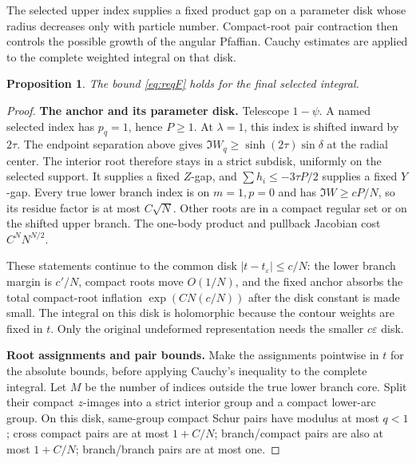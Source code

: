 \documentclass[11pt]{article}
\numberwithin{equation}{section}
\newtheorem{proposition}[theorem]{Proposition}
\theoremstyle{definition}
\newcommand{\eps}{\varepsilon}
\newcommand{\se}{t_\varepsilon}
\begin{document}
The selected upper index supplies a fixed product gap on a parameter
disk whose radius decreases only with particle number. Compact-root
pair contraction then controls the possible growth of the angular
Pfaffian. Cauchy estimates are applied to the complete weighted
integral on that disk.
\begin{proposition}\label{prop:F}
The bound \eqref{eq:reqF} holds for the final selected integral.
\end{proposition}
\begin{proof}
\noindent\textbf{The anchor and its parameter disk.} Telescope \(1-\psi\). A named selected index has \(p_q=1\), hence \(P\ge1\).
At \(\lambda=1\), this index is shifted inward by \(2\tau\).
The endpoint separation above gives
\(\Im W_q\ge\sinh(2\tau)\sin\delta\) at the radial center.
The interior root therefore stays in a strict subdisk, uniformly
on the selected support. It supplies a fixed \(Z\)-gap, and
\(\sum h_i\le-3\tau P/2\) supplies a fixed \(Y\)-gap.
Every true lower branch index is on \(m=1,p=0\) and has
\(\Im W\ge cP/N\), so its residue factor is at most \(C\sqrt N\).
Other roots are in a compact regular set or on the shifted upper
branch. The one-body product and pullback Jacobian cost
\(C^N N^{N/2}\).

These statements continue to the common disk \(|t-\se|\le c/N\):
the lower branch margin is \(c'/N\), compact roots move \(O(1/N)\),
and the fixed anchor absorbs the total compact-root inflation
\(\exp(CN(c/N))\) after the disk constant is made small.
The integral on this disk is holomorphic because the contour weights
are fixed in \(t\). Only the original undeformed representation needs
the smaller \(c\eps\) disk.

\par\smallskip\noindent\textbf{Root assignments and pair bounds.}
Make the assignments pointwise in $t$ for the absolute bounds, before
applying Cauchy's inequality to the complete integral.
Let \(M\) be the number of indices outside the true lower branch core.
Split their compact \(z\)-images into a strict interior group and a
compact lower-arc group. On this disk, same-group compact Schur
pairs have modulus at most \(q<1\); cross compact pairs are at most
\(1+C/N\); branch/compact pairs are also at most \(1+C/N\);
branch/branch pairs are at most one.


\end{proof}
\end{document}
